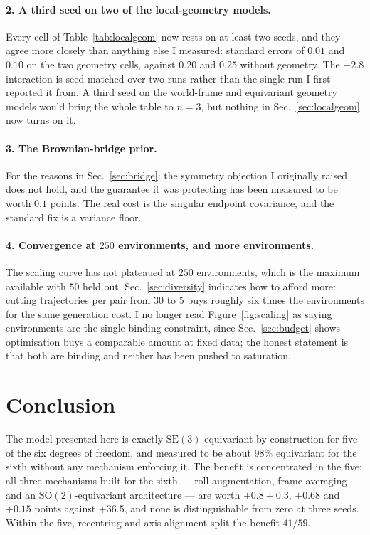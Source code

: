 \documentclass[11pt,a4paper]{article}
\newcommand{\SE}{\mathrm{SE}(3)}
\newcommand{\SO}{\mathrm{SO}}
\begin{document}
\paragraph{2. A third seed on two of the local-geometry models.} Every cell of
Table~\ref{tab:localgeom} now rests on at least two seeds, and they agree more
closely than anything else I measured: standard errors of $0.01$ and $0.10$ on
the two geometry cells, against $0.20$ and $0.25$ without geometry. The
$+2.8$ interaction is seed-matched over two runs rather than the single run I
first reported it from. A third seed on the world-frame and equivariant geometry
models would bring the whole table to $n=3$, but nothing in
Sec.~\ref{sec:localgeom} now turns on it.

\paragraph{3. The Brownian-bridge prior.} For the reasons in
Sec.~\ref{sec:bridge}: the symmetry objection I originally raised does not hold,
and the guarantee it was protecting has been measured to be worth $0.1$ points.
The real cost is the singular endpoint covariance, and the standard fix is a
variance floor.

\paragraph{4. Convergence at $250$ environments, and more environments.} The scaling curve has
not plateaued at $250$ environments, which is the maximum available with $50$
held out. Sec.~\ref{sec:diversity} indicates how to afford more: cutting
trajectories per pair from $30$ to $5$ buys roughly six times the environments
for the same generation cost. I no longer read Figure~\ref{fig:scaling} as saying
environments are the single binding constraint, since Sec.~\ref{sec:budget} shows
optimisation buys a comparable amount at fixed data; the honest statement is that
both are binding and neither has been pushed to saturation.

\section{Conclusion}

The model presented here is exactly $\SE$-equivariant by construction for five of
the six degrees of freedom, and measured to be about $98\%$ equivariant for the
sixth without any mechanism enforcing it. The benefit is concentrated in the
five: all three mechanisms built for the sixth --- roll augmentation, frame
averaging and an $\SO(2)$-equivariant architecture --- are worth $+0.8 \pm 0.3$,
$+0.68$ and $+0.15$ points against $+36.5$, and none is distinguishable from zero
at three seeds. Within the five, recentring and axis alignment split the benefit
$41/59$.
\end{document}
